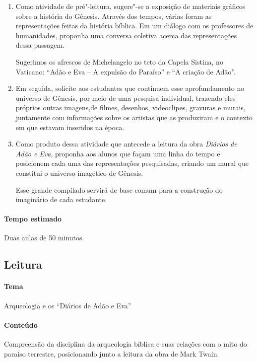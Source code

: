 \documentclass[12pt]{extarticle}
\begin{document}
\begin{enumerate}
\item
Como atividade de pré"-leitura, sugere"-se a exposição de materiais gráficos
sobre a história do Gênesis. Através dos tempos, várias foram as
representações feitas da história bíblica. Em um diálogo com os professores de humanidades, 
proponha uma conversa coletiva acerca das representações dessa passagem. 

Sugerimos os afrescos de Michelangelo no teto da 
Capela Sistina, no Vaticano: ``Adão e Eva -- A expulsão do Paraíso'' e ``A criação de Adão''. 

\item
Em seguida, solicite aos estudantes que continuem esse aprofundamento no universo de Gênesis, por 
meio de uma pesquisa individual, trazendo eles próprios outras imagens,de filmes, desenhos, videoclipes, 
gravuras e murais, juntamente com informações sobre os artistas que as produziram
e o contexto em que estavam inseridos na época.

\item
Como produto dessa atividade que antecede a leitura da obra \emph{Diários de Adão e Eva}, proponha aos alunos 
que façam uma linha do tempo e posicionem cada uma das representações pesquisadas, criando um  
mural que constitui o universo imagético de Gênesis. 

Esse grande compilado servirá de base comum para a construção do imaginário 
de cada estudante.

\end{enumerate}

\paragraph{Tempo estimado} Duas aulas de 50 minutos. 

\subsection{Leitura} 

\paragraph{Tema} Arqueologia e os ``Diários de Adão e Eva''

\paragraph{Conteúdo} Compreensão da disciplina da arqueologia bíblica e suas relações com o 
mito do paraíso terrestre, posicionando junto a leitura da obra de Mark Twain.
\end{document}
